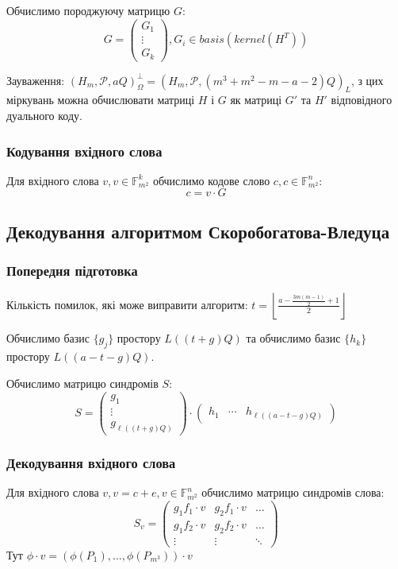 \documentclass[a4paper,12pt,oneside]{article}
\begin{document}
Обчислимо породжуючу матрицю $G$:
$$
G =
\begin{pmatrix}
    G_1 \\
    \vdots \\
    G_k
\end{pmatrix}, G_i \in basis(kernel(H^T))
$$

Зауваження: $(H_m, \mathcal{P}, aQ)_\Omega^\perp = (H_m, \mathcal{P}, (m^3+m^2-m-a-2)Q)_L$, з цих міркувань можна обчислювати матриці $H$ і $G$ як матриці 
$G'$ та $H'$ відповідного дуального коду.

\subsubsection{Кодування вхідного слова}
Для вхідного слова $v, v\in \mathbb{F}_{m^2}^k$ обчислимо кодове слово $c, c \in \mathbb{F}_{m^2}^n$:
$$c = v \cdot G$$
 
\subsection{Декодування алгоритмом Скоробогатова-Вледуца}
\subsubsection{Попередня підготовка}
Кількість помилок, які може виправити алгоритм: $t = \left \lfloor \frac{a-\frac{3m(m-1)}{2} + 1}{2} \right \rfloor$

Обчислимо базис $\{g_j\}$ простору $L( (t+g)Q )$ та обчислимо базис $\{h_k\}$ простору $L( (a-t-g)Q)$.

Обчислимо матрицю синдромів $S$:
$$
S = 
\begin{pmatrix}
    g_1 \\
    \vdots \\
    g_{\ell( (t+g)Q )}
\end{pmatrix}
\cdot
\begin{pmatrix}
    h_1 & \cdots & h_{\ell( (a-t-g)Q)}
\end{pmatrix}
$$

\subsubsection{Декодування вхідного слова}
Для вхідного слова $v, v=c+e, v \in \mathbb{F}_{m^2}^n$ обчислимо матрицю синдромів слова:
$$
S_v = 
\begin{pmatrix}
    g_1 f_1 \cdot v & g_2 f_1 \cdot v & \dots \\
    g_1 f_2 \cdot v & g_2 f_2 \cdot v & \dots \\
    \vdots & \vdots & \ddots
\end{pmatrix}
$$
Тут $\phi \cdot v = (\phi(P_1), \dots , \phi(P_{m^3})) \cdot v$
\end{document}
